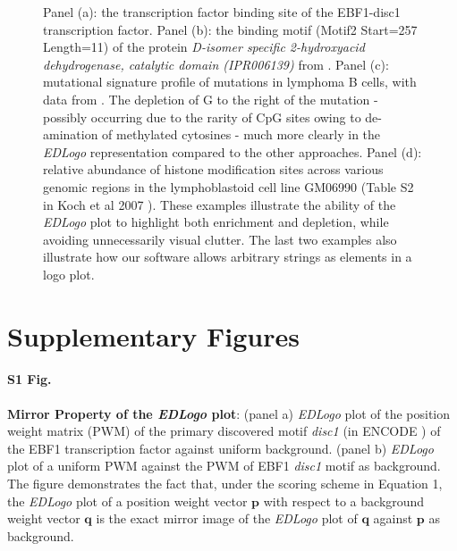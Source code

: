 \documentclass{bmcart}
\def\p{{\mathbf p}}
\def\q{{\mathbf q}}
\begin{document}
\begin{backmatter}
\begin{figure}[h!] 
  \caption{ 
Panel (a): the transcription factor binding site of the EBF1-disc1 transcription factor. Panel (b): the binding motif (Motif2 Start=257 Length=11) of the protein \textit{D-isomer specific 2-hydroxyacid dehydrogenase, catalytic domain (IPR006139)} from  \cite{Shameer2009,Joseph2014}. 
Panel (c): mutational signature profile of mutations in lymphoma B cells, with data from \cite{Alexandrov2013}. The depletion of G to the right of the mutation - possibly occurring due to the rarity of CpG sites owing to de-amination of methylated cytosines - much more clearly in the \textit{EDLogo} representation compared to the other approaches. Panel (d): relative abundance of histone modification sites across various genomic regions in the lymphoblastoid cell line GM06990 (Table S2 in Koch et al 2007 \cite{Koch2007}). 
These examples illustrate the ability of the \textit{EDLogo} plot to highlight both enrichment and depletion,
while avoiding unnecessarily visual clutter. The last two examples also illustrate how our software allows arbitrary strings as elements in a logo plot. 
}
\label{fig:fig1}
\end{figure}

\newpage

\section*{Supplementary Figures}

\newpage

\paragraph*{S1 Fig.}
\label{fig:suppfig1}   
\textbf{Mirror Property of the \textit{EDLogo} plot}: (panel a) \textit{EDLogo} plot of the  position weight matrix (PWM) of the primary discovered motif \textit{disc1} (in ENCODE \cite{Kheradpour2013}) of the EBF1 transcription factor against uniform background. (panel b) \textit{EDLogo} plot of a uniform PWM against the PWM of  EBF1 \textit{disc1} motif as background. The figure demonstrates the fact that, under the scoring scheme in Equation 1, the \textit{EDLogo} plot of a position weight vector $\p$ with respect to a background weight vector $\q$ is the exact mirror image of the \textit{EDLogo} plot of $\q$ against $\p$ as background.


\end{backmatter}
\end{document}
